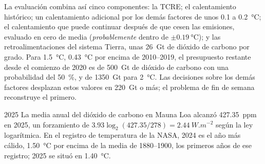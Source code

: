 La evaluación combina así cinco componentes: la TCRE; el calentamiento histórico; un
calentamiento adicional por los demás factores de unos 0.1 a \qty{0.2}{\celsius}; el calentamiento que puede
continuar después de que cesen las emisiones, evaluado en cero de media (\emph{probablemente} dentro de $\pm
\qty{0.19}{\celsius}$); y las retroalimentaciones del sistema Tierra, unas \qty{26}{Gt} de dióxido de carbono por
grado. Para \qty{1.5}{\celsius}, \qty{0.43}{\celsius} por encima de 2010--2019, el presupuesto restante desde el
comienzo de 2020 es de \qty{500}{Gt} de dióxido de carbono con una probabilidad del \qty{50}{\percent}, y de
\qty{1350}{Gt} para \qty{2}{\celsius}. Las decisiones sobre los demás factores desplazan estos valores en
\qty{220}{Gt} o más; el problema de fin de semana reconstruye el primero.

\begin{dated}{2025}
La media anual del dióxido de carbono en Mauna Loa alcanzó \qty{427.35}{ppm} en 2025, un forzamiento de
$3.93\log_2(427.35/278) = \qty{2.44}{W.m^{-2}}$ según la ley logarítmica. En el registro de temperatura de la NASA,
2024 es el año más cálido, \qty{1.50}{\celsius} por encima de la media de 1880--1900, los primeros
años de ese registro; 2025 se situó en \qty{1.40}{\celsius}.
\end{dated}


